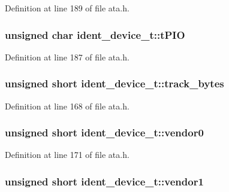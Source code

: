 Definition at line 189 of file ata.\+h.

\subsubsection[{\texorpdfstring{t\+P\+IO}{tPIO}}]{\setlength{\rightskip}{0pt plus 5cm}unsigned char ident\+\_\+device\+\_\+t\+::t\+P\+IO}\hypertarget{structident__device__t_a98aef15c0899c883fad89b60d712d4cb}{}\label{structident__device__t_a98aef15c0899c883fad89b60d712d4cb}


Definition at line 187 of file ata.\+h.

\subsubsection[{\texorpdfstring{track\+\_\+bytes}{track_bytes}}]{\setlength{\rightskip}{0pt plus 5cm}unsigned short ident\+\_\+device\+\_\+t\+::track\+\_\+bytes}\hypertarget{structident__device__t_ac5bfb23af07632fcb7ab55872b7e8839}{}\label{structident__device__t_ac5bfb23af07632fcb7ab55872b7e8839}


Definition at line 168 of file ata.\+h.

\subsubsection[{\texorpdfstring{vendor0}{vendor0}}]{\setlength{\rightskip}{0pt plus 5cm}unsigned short ident\+\_\+device\+\_\+t\+::vendor0}\hypertarget{structident__device__t_ad4057b661fe03727c4c8c5c131beba91}{}\label{structident__device__t_ad4057b661fe03727c4c8c5c131beba91}


Definition at line 171 of file ata.\+h.

\subsubsection[{\texorpdfstring{vendor1}{vendor1}}]{\setlength{\rightskip}{0pt plus 5cm}unsigned short ident\+\_\+device\+\_\+t\+::vendor1}\hypertarget{structident__device__t_a690a82fc5e0d922b28a2706e57298ef0}{}\label{structident__device__t_a690a82fc5e0d922b28a2706e57298ef0}


